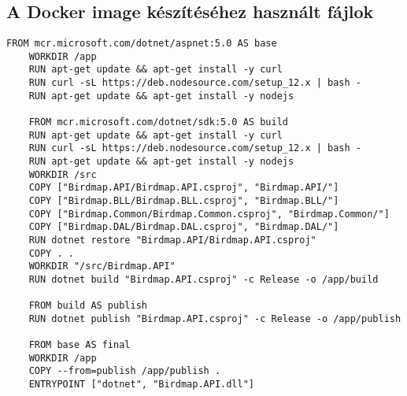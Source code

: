 \appendix
\chapter*{\fuggelek}
\setcounter{chapter}{\appendixnumber}

\section{A Docker image készítéséhez használt fájlok}
\begin{lstlisting}[style=dockerfile, caption=A Dockerfile tartalma, label=lst:dockerfile]
    FROM mcr.microsoft.com/dotnet/aspnet:5.0 AS base
    WORKDIR /app
    RUN apt-get update && apt-get install -y curl
    RUN curl -sL https://deb.nodesource.com/setup_12.x | bash -
    RUN apt-get update && apt-get install -y nodejs

    FROM mcr.microsoft.com/dotnet/sdk:5.0 AS build
    RUN apt-get update && apt-get install -y curl
    RUN curl -sL https://deb.nodesource.com/setup_12.x | bash -
    RUN apt-get update && apt-get install -y nodejs
    WORKDIR /src
    COPY ["Birdmap.API/Birdmap.API.csproj", "Birdmap.API/"]
    COPY ["Birdmap.BLL/Birdmap.BLL.csproj", "Birdmap.BLL/"]
    COPY ["Birdmap.Common/Birdmap.Common.csproj", "Birdmap.Common/"]
    COPY ["Birdmap.DAL/Birdmap.DAL.csproj", "Birdmap.DAL/"]
    RUN dotnet restore "Birdmap.API/Birdmap.API.csproj"
    COPY . .
    WORKDIR "/src/Birdmap.API"
    RUN dotnet build "Birdmap.API.csproj" -c Release -o /app/build

    FROM build AS publish
    RUN dotnet publish "Birdmap.API.csproj" -c Release -o /app/publish

    FROM base AS final
    WORKDIR /app
    COPY --from=publish /app/publish .
    ENTRYPOINT ["dotnet", "Birdmap.API.dll"]
\end{lstlisting}

